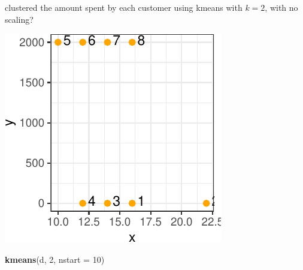 \documentclass[]{article}
\newenvironment{Shaded}{\begin{snugshade}}{\end{snugshade}}
\newcommand{\DataTypeTok}[1]{\textcolor[rgb]{0.13,0.29,0.53}{#1}}
\newcommand{\DecValTok}[1]{\textcolor[rgb]{0.00,0.00,0.81}{#1}}
\newcommand{\FloatTok}[1]{\textcolor[rgb]{0.00,0.00,0.81}{#1}}
\newcommand{\KeywordTok}[1]{\textcolor[rgb]{0.13,0.29,0.53}{\textbf{#1}}}
\newcommand{\NormalTok}[1]{#1}
\newcommand{\OperatorTok}[1]{\textcolor[rgb]{0.81,0.36,0.00}{\textbf{#1}}}
\newcommand{\StringTok}[1]{\textcolor[rgb]{0.31,0.60,0.02}{#1}}
\begin{document}
clustered the amount spent by each customer using kmeans with \(k = 2\),
with no scaling?

\begin{Shaded}
\end{Shaded}

\begin{center}\includegraphics{sol_A1_files/figure-latex/unnamed-chunk-5-1} \end{center}

\begin{Shaded}
\begin{Highlighting}[]
\KeywordTok{kmeans}\NormalTok{(d, }\DecValTok{2}\NormalTok{, }\DataTypeTok{nstart =} \DecValTok{10}\NormalTok{)}
\end{Highlighting}
\end{Shaded}
\end{document}
